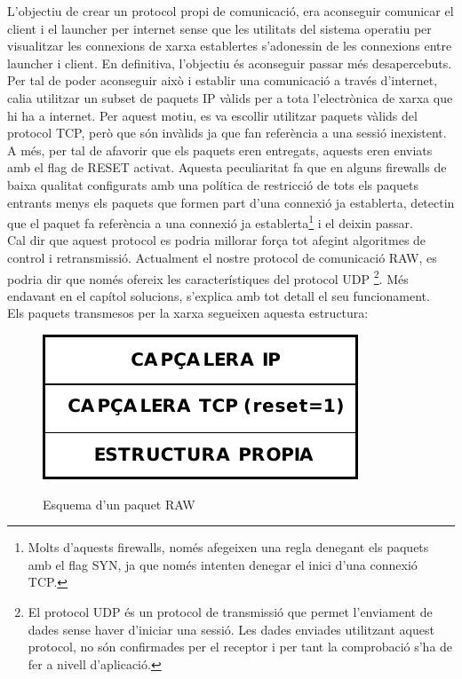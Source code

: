 L'objectiu de crear un protocol propi de comunicació, era aconseguir comunicar el client i el launcher per
internet sense que les utilitats del sistema operatiu per visualitzar les connexions de xarxa establertes
s'adonessin de les connexions entre launcher i client. En definitiva, l'objectiu és aconseguir passar més 
desapercebuts. \\

Per tal de poder aconseguir això i establir una comunicació a través d'internet, calia utilitzar un subset de 
paquets IP vàlids per a tota l'electrònica de xarxa que hi ha a internet. Per aquest motiu, es va escollir
utilitzar paquets vàlids del protocol TCP, però que són invàlids ja que fan referència a una sessió inexistent.
A més, per tal de afavorir que els paquets eren entregats, aquests eren enviats amb el flag de RESET activat. 
Aquesta peculiaritat fa que en alguns firewalls de baixa qualitat configurats amb una política de restricció de 
tots els paquets entrants menys els paquets que formen part d'una connexió ja establerta, detectin que el paquet
fa referència a una connexió ja establerta\footnote{Molts d'aquests firewalls, només afegeixen una regla denegant
els paquets amb el flag SYN, ja que només intenten denegar el inici d'una connexió TCP.} i el deixin passar. \\

Cal dir que aquest protocol es podria millorar força tot afegint algoritmes de control i retransmissió. Actualment
el nostre protocol de comunicació RAW, es podria dir que només ofereix les característiques del protocol UDP
\footnote{El protocol UDP és un protocol de transmissió que permet l'enviament de dades sense haver d'iniciar una 
sessió. Les dades enviades utilitzant aquest protocol, no són confirmades per el receptor i per tant la comprobació
s'ha de fer a nivell d'aplicació.}. Més endavant en el capítol solucions, s'explica amb tot detall el seu funcionament. \\

Els paquets transmesos per la xarxa segueixen aquesta estructura: \\

\begin{figure}[htp]
    \centering
    \includegraphics[scale=1,keepaspectratio]{diagrames/solutionDesignPacketStructure.pdf} \\
    \caption{Esquema d'un paquet RAW}
    \label{fig:packetScheme}
\end{figure}


